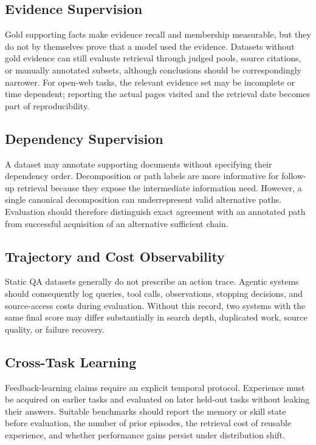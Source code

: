 \subsection{Evidence Supervision}
Gold supporting facts make evidence recall and membership measurable, but they do not by themselves prove that a model used the evidence. Datasets without gold evidence can still evaluate retrieval through judged pools, source citations, or manually annotated subsets, although conclusions should be correspondingly narrower. For open-web tasks, the relevant evidence set may be incomplete or time dependent; reporting the actual pages visited and the retrieval date becomes part of reproducibility.

\subsection{Dependency Supervision}
A dataset may annotate supporting documents without specifying their dependency order. Decomposition or path labels are more informative for follow-up retrieval because they expose the intermediate information need. However, a single canonical decomposition can underrepresent valid alternative paths. Evaluation should therefore distinguish exact agreement with an annotated path from successful acquisition of an alternative sufficient chain.

\subsection{Trajectory and Cost Observability}
Static QA datasets generally do not prescribe an action trace. Agentic systems should consequently log queries, tool calls, observations, stopping decisions, and source-access costs during evaluation. Without this record, two systems with the same final score may differ substantially in search depth, duplicated work, source quality, or failure recovery.

\subsection{Cross-Task Learning}
Feedback-learning claims require an explicit temporal protocol. Experience must be acquired on earlier tasks and evaluated on later held-out tasks without leaking their answers. Suitable benchmarks should report the memory or skill state before evaluation, the number of prior episodes, the retrieval cost of reusable experience, and whether performance gains persist under distribution shift.
